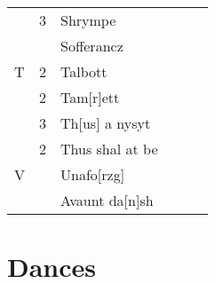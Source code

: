 \documentclass[12pt,letter]{article} %
\begin{document}
\begin{center}
\begin{table}[ht]
\begin{tabular}{lcl clr}
  & 3 & Shrympe & & & \\
  &   & Sofferancz & & & \\
T & 2 & Talbott & & & \\
  & 2 & Tam[r]ett & & & \\
  & 3 & Th[us] a nysyt & & & \\
  & 2 & Thus shal at be & & & \\
V &   & Unafo[rzg]  & & & \\
  &   & Avaunt da[n]sh & & & \\
\end{tabular}
\end{table}
\end{center}


\newpage 
    \section{Dances}
    \textwidth=3.5in
    \marginparwidth=2in
    \oddsidemargin=2in

    \reversemarginpar
\end{document}

